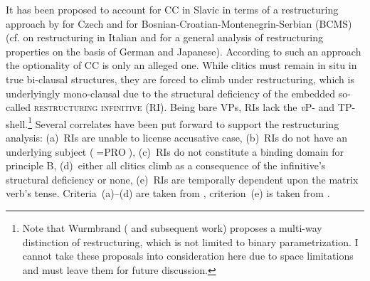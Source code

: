\documentclass[output=paper,colorlinks,citecolor=brown]{langscibook}
\begin{document}
\ea\label{kul:ex:asi-ho}
\z
\z

\ea\label{kul:ex:jan-go}
\z
\z

\begin{sloppypar}
\noindent It has been proposed to account for CC in Slavic in terms of a restructuring approach by \citet{Rezac2005} for Czech and \citet{Aljović2004} for Bosnian-Croatian-Montenegrin-Serbian (BCMS) (cf. \citealt{Rizzi1982} on restructuring in Italian and \citealt{Wurmbrand2001} for a general analysis of restructuring properties on the basis of German and Japanese). According to such an approach the optionality of CC is only an alleged one. While clitics must remain in situ in true bi-clausal structures, they are forced to climb under restructuring, which is underlyingly mono-clausal due to the structural deficiency of the embedded so-called \textsc{restructuring infinitive} (RI). Being bare VPs, RIs lack the \textit{v}P- and TP-shell.\footnote{Note that Wurmbrand (\citeyear{Wurmbrand2001} and subsequent work) proposes a multi-way distinction of restructuring, which is not limited to binary parametrization. I cannot take these proposals into consideration here due to space limitations and must leave them for future discussion.} Several correlates have been put forward to support the restructuring analysis: (a)~RIs are unable to license accusative case, (b)~RIs do not have an underlying subject ($=\text{PRO}$), (c)~RIs do not constitute a binding domain for principle B, (d)~either all clitics climb as a consequence of the infinitive’s structural deficiency or none, (e)~RIs are temporally dependent upon the matrix verb’s tense. Criteria~(a)–(d) are taken from \citet{Rezac2005}, criterion~(e) is taken from \citet{Todorovic2012}.
\end{sloppypar}
\end{document}
